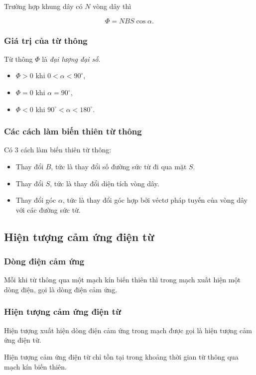 Trường hợp khung dây có $N$ vòng dây thì

 \begin{equation}
 \Phi=NBS\cos \alpha.
 \end{equation}

\subsubsection{Giá trị của từ thông}
Từ thông $\Phi$ là \textit{đại lượng đại số}.
\begin{itemize}
\item $\Phi >0$ khi $0<\alpha <90^\circ$,
\item $\Phi =0$ khi $\alpha =90^\circ$,
\item $\Phi <0$ khi $90^\circ<\alpha <180^\circ$.
\end{itemize}


\subsubsection{Các cách làm biến thiên từ thông}
Có 3 cách làm biến thiên từ thông:
\begin{itemize}
	\item Thay đổi $B$, tức là thay đổi số đường sức từ đi qua mặt $S$.
	\item Thay đổi $S$, tức là thay đổi diện tích vòng dây.
	\item Thay đổi góc $\alpha$, tức là thay đổi góc hợp bởi véctơ pháp tuyến của vòng dây với các đường sức từ.
\end{itemize}
\subsection{Hiện tượng cảm ứng điện từ}
\subsubsection{Dòng điện cảm ứng}
Mỗi khi từ thông qua một mạch kín biến thiên thì trong mạch xuất hiện một dòng điện, gọi là dòng điện cảm ứng.
\subsubsection{Hiện tượng cảm ứng điện từ}
Hiện tượng xuất hiện dòng điện cảm ứng trong mạch được gọi là hiện tượng cảm ứng điện từ.

Hiện tượng cảm ứng điện từ chỉ tồn tại trong khoảng thời gian từ thông qua mạch kín biến thiên.



